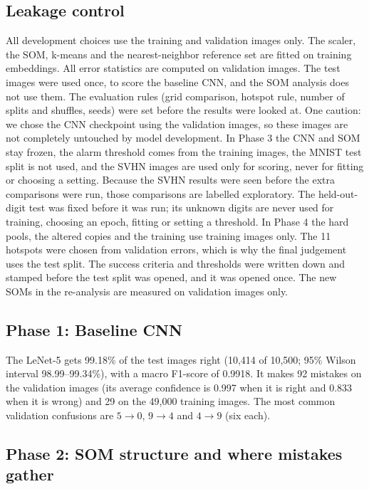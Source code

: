 \documentclass[11pt]{article}
\begin{document}
\subsection{Leakage control}

All development choices use the training and validation images only. The scaler, the SOM, k-means and the nearest-neighbor reference set are fitted on training embeddings. All error statistics are computed on validation images.
The test images were used once, to score the baseline CNN, and the SOM analysis does not use them. The evaluation rules (grid comparison, hotspot rule, number of splits and shuffles, seeds) were set before the results were looked at.
One caution: we chose the CNN checkpoint using the validation images, so these images are not completely untouched by model development.
In Phase 3 the CNN and SOM stay frozen, the alarm threshold comes from the training images, the MNIST test split is not used, and the SVHN images are used only for scoring, never for fitting or choosing a setting. Because the SVHN results were seen before the extra comparisons were run, those comparisons are labelled exploratory. The held-out-digit test was fixed before it was run; its unknown digits are never used for training, choosing an epoch, fitting or setting a threshold.
In Phase 4 the hard pools, the altered copies and the training use training images only. The 11 hotspots were chosen from validation errors, which is why the final judgement uses the test split. The success criteria and thresholds were written down and stamped before the test split was opened, and it was opened once. The new SOMs in the re-analysis are measured on validation images only.

\subsection{Phase 1: Baseline CNN}

The LeNet-5 gets 99.18\% of the test images right (10,414 of 10,500; 95\% Wilson interval 98.99--99.34\%), with a macro F1-score of 0.9918. It makes 92 mistakes on the validation images
(its average confidence is 0.997 when it is right and 0.833 when it is wrong) and 29 on the 49,000 training images. The most common validation confusions are $5\rightarrow0$, $9\rightarrow4$ and $4\rightarrow9$ (six each).

\subsection{Phase 2: SOM structure and where mistakes gather}
\end{document}
